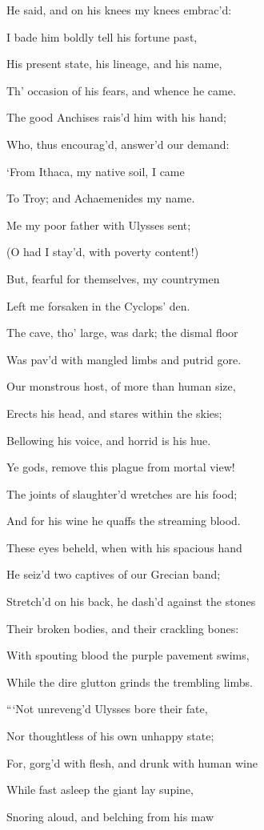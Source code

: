 He said, and on his knees my knees embrac’d:

I bade him boldly tell his fortune past,

His present state, his lineage, and his name,

Th’ occasion of his fears, and whence he came.

The good Anchises rais’d him with his hand;

Who, thus encourag’d, answer’d our demand:

‘From Ithaca, my native soil, I came

To Troy; and Achaemenides my name.

Me my poor father with Ulysses sent;

(O had I stay’d, with poverty content!)

But, fearful for themselves, my countrymen

Left me forsaken in the Cyclops’ den.

The cave, tho’ large, was dark; the dismal floor

Was pav’d with mangled limbs and putrid gore.

Our monstrous host, of more than human size,

Erects his head, and stares within the skies;

Bellowing his voice, and horrid is his hue.

Ye gods, remove this plague from mortal view!

The joints of slaughter’d wretches are his food;

And for his wine he quaffs the streaming blood.

These eyes beheld, when with his spacious hand

He seiz’d two captives of our Grecian band;

Stretch’d on his back, he dash’d against the stones

Their broken bodies, and their crackling bones:

With spouting blood the purple pavement swims,

While the dire glutton grinds the trembling limbs.

“‘Not unreveng’d Ulysses bore their fate,

Nor thoughtless of his own unhappy state;

For, gorg’d with flesh, and drunk with human wine

While fast asleep the giant lay supine,

Snoring aloud, and belching from his maw

